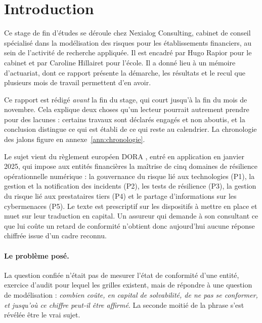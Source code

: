 \documentclass[12pt,a4paper]{article}
\theoremstyle{definition}
\newcommand{\entreprise}{Nexialog Consulting}
\begin{document}
\begin{singlespace}
\tableofcontents
\end{singlespace}
\newpage

\section{Introduction}
\label{s:intro}

Ce stage de fin d'études se déroule chez \entreprise, cabinet de conseil spécialisé
dans la modélisation des risques pour les établissements financiers, au sein de
l'activité de recherche appliquée. Il est encadré par Hugo Rapior pour le cabinet
et par Caroline Hillairet pour l'école. Il a donné lieu à un mémoire d'actuariat,
dont ce rapport présente la démarche, les résultats et le recul que plusieurs mois
de travail permettent d'en avoir.

Ce rapport est rédigé \emph{avant} la fin du stage, qui court jusqu'à la fin du mois
de novembre. Cela explique deux choses qu'un lecteur pourrait autrement prendre pour
des lacunes : certains travaux sont déclarés engagés et non aboutis, et la
conclusion distingue ce qui est établi de ce qui reste au calendrier. La chronologie
des jalons figure en annexe~\ref{ann:chronologie}.

Le sujet vient du règlement européen DORA \citep{DORA2022}, entré en application
en janvier 2025, qui impose aux entités financières la maîtrise de cinq domaines
de résilience opérationnelle numérique : la gouvernance du risque lié aux
technologies (P1), la gestion et la notification des incidents (P2), les tests de
résilience (P3), la gestion du risque lié aux prestataires tiers (P4) et le
partage d'informations sur les cybermenaces (P5). Le texte est prescriptif sur les
dispositifs à mettre en place et muet sur leur traduction en capital. Un assureur
qui demande à son consultant ce que lui coûte un retard de conformité n'obtient
donc aujourd'hui aucune réponse chiffrée issue d'un cadre reconnu.

\paragraph{Le problème posé.} La question confiée n'était pas de mesurer l'état de
conformité d'une entité, exercice d'audit pour lequel les grilles existent, mais
de répondre à une question de modélisation : \emph{combien coûte, en capital de
solvabilité, de ne pas se conformer, et jusqu'où ce chiffre peut-il être affirmé}.
La seconde moitié de la phrase s'est révélée être le vrai sujet.
\end{document}

